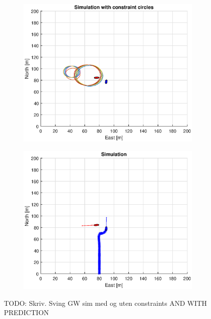 \begin{figure}[ht]
\begin{subfigure}[b]{0.499\textwidth}
    \end{subfigure}
    \hfill
    \\
    \begin{subfigure}[b]{0.49\textwidth}
        \centering
        \includegraphics[width=\textwidth]{Images/Figures/sving_GW/Simple0_f1_Frame6}
    \end{subfigure}
    \hfill
    \begin{subfigure}[b]{0.499\textwidth}
        \centering
        \includegraphics[width=\textwidth]{Images/Figures/sving_GW/Simple0_f600_Frame6}
    \end{subfigure}
    \hfill
    \caption{TODO: Skriv. Sving GW sim med og uten constraints AND WITH PREDICTION}
\end{figure}

